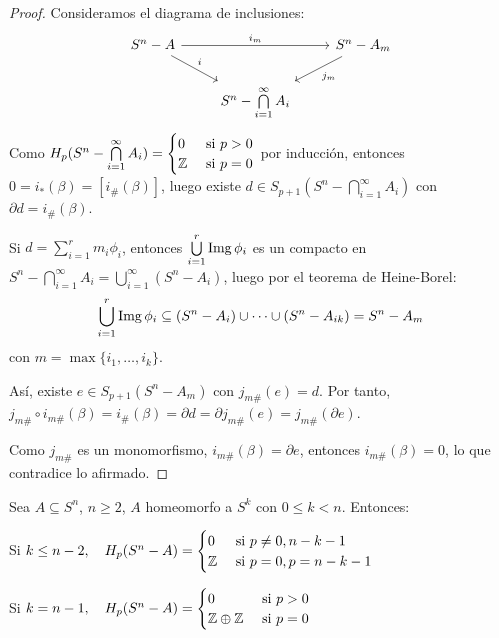 \begin{proof}
  Consideramos el diagrama de inclusiones:
  \[ \begin{tikzcd}
    S^n - A \arrow{dr}{i} \arrow{rr}{i_m} & & S^n - A_m \arrow{dl}{j_m} \\
    & S^n - \bigcap\limits_{i = 1}^\infty A_i
  \end{tikzcd} \]
  Como $H_p(S^n - \bigcap\limits_{i = 1}^\infty A_i) = \begin{cases} 0 &\text{ si } p > 0 \\ \mathbb{Z} &\text{ si } p = 0 \end{cases}$ por inducción, entonces
  $0 = i_*(\beta) = [i_\#(\beta)]$, luego existe $d \in S_{p+1}(S^n - \bigcap\limits_{i = 1}^\infty A_i)$ con $\partial d = i_\#(\beta)$.

  Si $d = \sum\limits_{i = 1}^r m_i \phi_i$, entonces $\bigcup\limits_{i = 1}^r \operatorname{Img} \phi_i$ es un compacto en $S^n - \bigcap\limits_{i = 1}^\infty A_i
  = \bigcup\limits_{i = 1}^\infty (S^n - A_i)$, luego por el teorema de Heine-Borel:
  \[\bigcup\limits_{i = 1}^r \operatorname{Img} \phi_i \subseteq (S^n - A_i) \cup \dots \cup (S^n - A_{ik}) = S^n - A_m \]
  con $m = \max\{i_1, \dots, i_k\}$.

  Así, existe $e \in S_{p+1}(S^n - A_m)$ con $j_{m\#}(e) = d$. Por tanto, $j_{m\#} \circ i_{m\#} (\beta) = i_\#(\beta) = \partial d
  = \partial j_{m\#}(e) = j_{m\#}(\partial e)$.

  Como $j_{m\#}$ es un monomorfismo, $i_{m\#}(\beta) = \partial e$, entonces $i_{m\#}(\beta) = 0$, lo que contradice lo afirmado.
\end{proof}

\begin{theorem}
  Sea $A \subseteq S^n$, $n \geq 2$, $A$ homeomorfo a $S^k$ con $0 \leq k < n$. Entonces:

  Si $k \leq n-2, \quad H_p(S^n - A) = \begin{cases} 0 &\text{ si } p \neq 0, n-k-1 \\ \mathbb{Z} &\text{ si } p = 0, p = n-k-1 \end{cases}$

  Si $k = n-1, \quad    H_p(S^n - A) = \begin{cases} 0 &\text{ si } p > 0 \\ \mathbb{Z} \oplus \mathbb{Z} &\text{ si } p = 0 \end{cases}$
\end{theorem}

